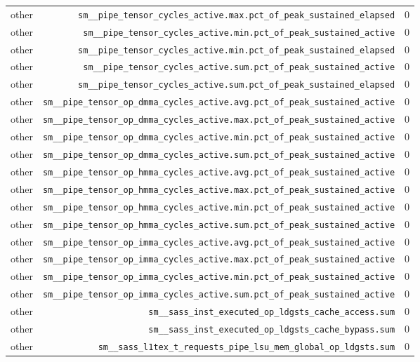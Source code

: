 \begin{table}[h]
\begin{tabular}{|l|r|r|}
other & \texttt{sm__pipe_tensor_cycles_active.max.pct_of_peak_sustained_elapsed} & 0 \\
other & \texttt{sm__pipe_tensor_cycles_active.min.pct_of_peak_sustained_active} & 0 \\
other & \texttt{sm__pipe_tensor_cycles_active.min.pct_of_peak_sustained_elapsed} & 0 \\
other & \texttt{sm__pipe_tensor_cycles_active.sum.pct_of_peak_sustained_active} & 0 \\
other & \texttt{sm__pipe_tensor_cycles_active.sum.pct_of_peak_sustained_elapsed} & 0 \\
other & \texttt{sm__pipe_tensor_op_dmma_cycles_active.avg.pct_of_peak_sustained_active} & 0 \\
other & \texttt{sm__pipe_tensor_op_dmma_cycles_active.max.pct_of_peak_sustained_active} & 0 \\
other & \texttt{sm__pipe_tensor_op_dmma_cycles_active.min.pct_of_peak_sustained_active} & 0 \\
other & \texttt{sm__pipe_tensor_op_dmma_cycles_active.sum.pct_of_peak_sustained_active} & 0 \\
other & \texttt{sm__pipe_tensor_op_hmma_cycles_active.avg.pct_of_peak_sustained_active} & 0 \\
other & \texttt{sm__pipe_tensor_op_hmma_cycles_active.max.pct_of_peak_sustained_active} & 0 \\
other & \texttt{sm__pipe_tensor_op_hmma_cycles_active.min.pct_of_peak_sustained_active} & 0 \\
other & \texttt{sm__pipe_tensor_op_hmma_cycles_active.sum.pct_of_peak_sustained_active} & 0 \\
other & \texttt{sm__pipe_tensor_op_imma_cycles_active.avg.pct_of_peak_sustained_active} & 0 \\
other & \texttt{sm__pipe_tensor_op_imma_cycles_active.max.pct_of_peak_sustained_active} & 0 \\
other & \texttt{sm__pipe_tensor_op_imma_cycles_active.min.pct_of_peak_sustained_active} & 0 \\
other & \texttt{sm__pipe_tensor_op_imma_cycles_active.sum.pct_of_peak_sustained_active} & 0 \\
other & \texttt{sm__sass_inst_executed_op_ldgsts_cache_access.sum} & 0 \\
other & \texttt{sm__sass_inst_executed_op_ldgsts_cache_bypass.sum} & 0 \\
other & \texttt{sm__sass_l1tex_t_requests_pipe_lsu_mem_global_op_ldgsts.sum} & 0 \\

\end{tabular}
\end{table}
